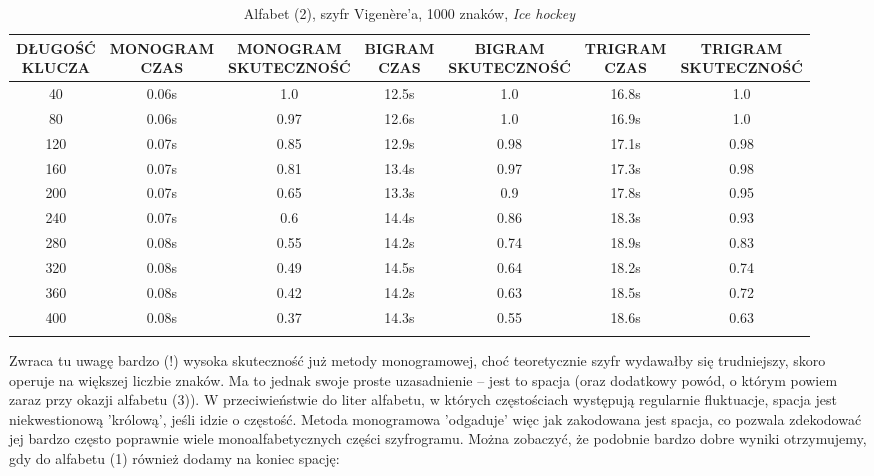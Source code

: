 \documentclass[a4paper]{article}
\theoremstyle{defn}
\theoremstyle{theorem}
\theoremstyle{lemma}
\theoremstyle{cor}
\theoremstyle{fact}
\begin{document}
\begin{center}\begin{small}\begin{longtable}{|c|c|c|c|c|c|c|}
\hline \makecell{DŁUGOŚĆ\\KLUCZA} &  \makecell{MONOGRAM\\CZAS} & \makecell{MONOGRAM\\SKUTECZNOŚĆ} & \makecell{BIGRAM\\CZAS} &  \makecell{BIGRAM\\SKUTECZNOŚĆ} & \makecell{TRIGRAM\\CZAS} & \makecell{TRIGRAM\\SKUTECZNOŚĆ}\\ \hline
40 & 0.06s & 1.0 & 12.5s & 1.0 & 16.8s & 1.0 \\ \hline
80 & 0.06s & 0.97 & 12.6s & 1.0 & 16.9s & 1.0 \\ \hline
120 & 0.07s & 0.85 & 12.9s & 0.98 & 17.1s & 0.98 \\ \hline
160 & 0.07s & 0.81 & 13.4s & 0.97 & 17.3s & 0.98 \\ \hline
200 & 0.07s & 0.65 & 13.3s & 0.9 & 17.8s & 0.95 \\ \hline
240 & 0.07s & 0.6 & 14.4s & 0.86 & 18.3s & 0.93 \\ \hline
280 & 0.08s & 0.55 & 14.2s & 0.74 & 18.9s & 0.83 \\ \hline
320 & 0.08s & 0.49 & 14.5s & 0.64 & 18.2s & 0.74 \\ \hline
360 & 0.08s & 0.42 & 14.2s & 0.63 & 18.5s & 0.72 \\ \hline
400 & 0.08s & 0.37 & 14.3s & 0.55 & 18.6s & 0.63 \\ \hline
\caption{Alfabet (2), szyfr Vigenère'a, 1000 znaków, \textit{Ice hockey}}
\end{longtable}\end{small}\end{center}
Zwraca tu uwagę bardzo (!) wysoka skuteczność już metody monogramowej, choć teoretycznie szyfr wydawałby się trudniejszy, skoro operuje na większej liczbie znaków. Ma to jednak swoje proste uzasadnienie – jest to spacja (oraz dodatkowy powód, o którym powiem zaraz przy okazji alfabetu (3)). W przeciwieństwie do liter alfabetu, w których częstościach występują regularnie fluktuacje, spacja jest niekwestionową 'królową', jeśli idzie o częstość. Metoda monogramowa 'odgaduje' więc jak zakodowana jest spacja, co pozwala zdekodować jej bardzo często poprawnie wiele monoalfabetycznych części szyfrogramu. Można zobaczyć, że podobnie bardzo dobre wyniki otrzymujemy, gdy do alfabetu (1) również dodamy na koniec spację:
\end{document}
